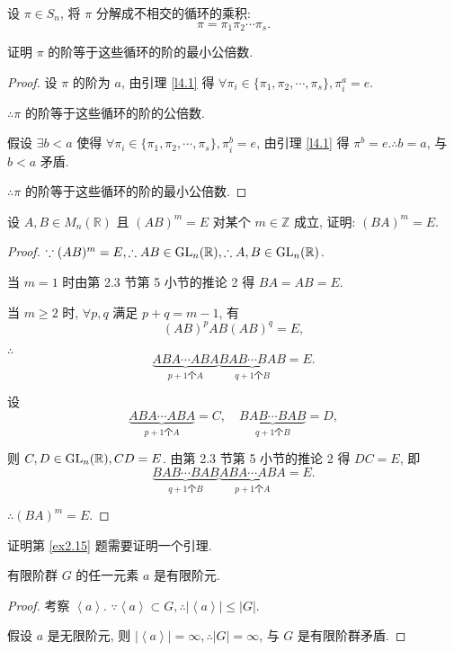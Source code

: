 \documentclass[color=black,device=normal,lang=cn,mode=geye]{elegantnote}
\begin{document}
\begin{exercise}%
    设 $\pi\in S_n$, 将 $\pi$ 分解成不相交的循环的乘积:
    \[\pi=\pi_1\pi_2\cdots\pi_s.\]

    证明 $\pi$ 的阶等于这些循环的阶的最小公倍数.
\end{exercise}
\begin{proof}
    设 $\pi$ 的阶为 $a$, 由引理 \ref{l4.1} 得 $\forall\pi_i\in\{\pi_1,\pi_2,\cdots,\pi_s\},\pi_i^a=e$.

    $\therefore\pi$ 的阶等于这些循环的阶的公倍数.

    假设 $\exists b<a$ 使得 $\forall\pi_i\in\{\pi_1,\pi_2,\cdots,\pi_s\},\pi_i^b=e$, 由引理 \ref{l4.1} 得 $\pi^b=e.\therefore b=a$, 与 $b<a$ 矛盾.

    $\therefore\pi$ 的阶等于这些循环的阶的最小公倍数.
\end{proof}
\begin{exercise}%
    设 $A,B\in M_n(\mathbb{R})$ 且 $(AB)^m=E$ 对某个 $m\in\mathbb{Z}$ 成立, 证明: $(BA)^m=E$.
\end{exercise}
\begin{proof}
    $\because(AB)^m=E,\therefore AB\in\operatorname{GL} _n(\mathbb{R}),\therefore A,B\in\operatorname{GL} _n(\mathbb{R})$.

    当 $m=1$ 时由第 2.3 节第 5 小节的推论 2 得 $BA=AB=E$.

    当 $m\geq2$ 时, $\forall p,q$ 满足 $p+q=m-1$, 有
    \[(AB)^pAB(AB)^q=E,\]

    $\therefore$
    \[\underbrace{ABA\cdots ABA}_{p+1\text{个}A}\underbrace{BAB\cdots BAB}_{q+1\text{个}B}=E.\]

    设
    \[\underbrace{ABA\cdots ABA}_{p+1\text{个}A}=C,\quad\underbrace{BAB\cdots BAB}_{q+1\text{个}B}=D,\]

    则 $C,D\in\operatorname{GL} _n(\mathbb{R}),CD=E$. 由第 2.3 节第 5 小节的推论 2 得 $DC=E$, 即
    \[\underbrace{BAB\cdots BAB}_{q+1\text{个}B}\underbrace{ABA\cdots ABA}_{p+1\text{个}A}=E.\]

    $\therefore(BA)^m=E$.
\end{proof}
证明第 \ref{ex2.15} 题需要证明一个引理.
\begin{lemma}\label{l4.2}
    有限阶群 $G$ 的任一元素 $a$ 是有限阶元.
\end{lemma}
\begin{proof}
    考察 $\left<a\right>$. $\because\left<a\right>\subset G,\therefore|\left<a\right>|\leq|G|$.

    假设 $a$ 是无限阶元, 则 $|\left<a\right>|=\infty,\therefore|G|=\infty$, 与 $G$ 是有限阶群矛盾.
\end{proof}
\end{document}
